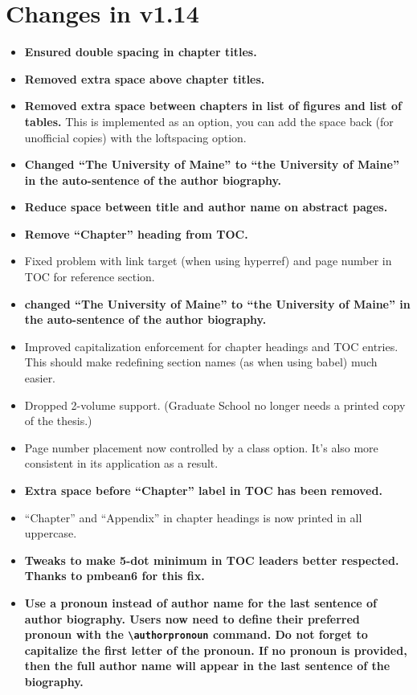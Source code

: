 \section{Changes in v1.14}
\begin{itemize}
\item{\bfseries Ensured double spacing in chapter titles.}
\item{\bfseries Removed extra space above chapter titles.}
\item{{\bfseries Removed extra space between chapters in list of figures and list of tables.} This is implemented as an option, you can add the space back (for unofficial copies) with the loftspacing option.}
\item{\bfseries Changed ``The University of Maine'' to ``the University of Maine'' in the auto-sentence of the author biography.}
\item{\bfseries Reduce space between title and author name on abstract pages.}
\item{\bfseries Remove “Chapter” heading from TOC.}
\item{Fixed problem with link target (when using hyperref) and page number in TOC for reference section.}
\item{\bfseries changed ``The University of Maine'' to ``the University of Maine'' in the auto-sentence of the author biography.}
\item{Improved capitalization enforcement for chapter headings and TOC entries.  This should make redefining section names (as when using babel) much easier.}
\item{Dropped 2-volume support. (Graduate School no longer needs a printed copy of the thesis.)}
\item{Page number placement now controlled by a class option.  It's also more consistent in its application as a result.}
\item{\bfseries Extra space before ``Chapter'' label in TOC has been removed.}
\item{``Chapter'' and ``Appendix'' in chapter headings is now printed in all uppercase.}
\item{\bfseries Tweaks to make 5-dot minimum in TOC leaders better respected.  Thanks to pmbean6 for this fix.}
\item{\bfseries Use a pronoun instead of author name for the last sentence of author biography.  Users now need to define their preferred pronoun with the \verb=\authorpronoun= command.  Do not forget to capitalize the first letter of the pronoun.  If no pronoun is provided, then the full author name will appear in the last sentence of the biography.}

\end{itemize}

